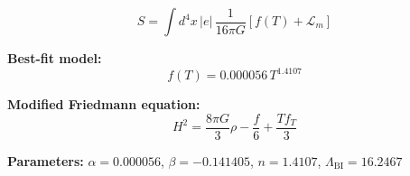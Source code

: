 
\begin{equation}
  S = \int d^4x \, |e| \, \frac{1}{16\pi G} \left[ f(T) + \mathcal{L}_m \right]
\end{equation}

\textbf{Best-fit model:}
\begin{equation}
  f(T) = 0.000056 \, T^{1.4107}
\end{equation}

\textbf{Modified Friedmann equation:}
\begin{equation}
  H^2 = \frac{8\pi G}{3} \rho - \frac{f}{6} + \frac{T f_T}{3}
\end{equation}

\textbf{Parameters:}
$\alpha = 0.000056$, \quad
$\beta = -0.141405$, \quad
$n = 1.4107$, \quad
$\Lambda_{\text{BI}} = 16.2467$